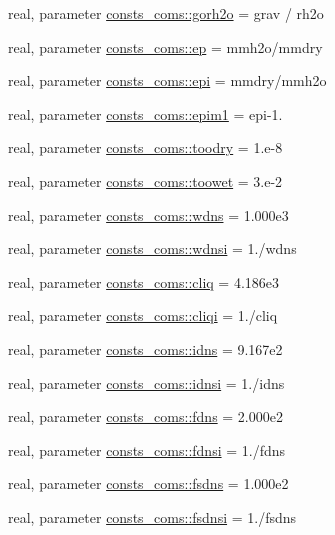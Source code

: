 \begin{DoxyCompactItemize}
real, parameter \hyperlink{namespaceconsts__coms_a0c33752e08988561908066daaa3574b9}{consts\+\_\+coms\+::gorh2o} = grav / rh2o
\item 
real, parameter \hyperlink{namespaceconsts__coms_a7c4e3129334941133aea2f4408d79a4c}{consts\+\_\+coms\+::ep} = mmh2o/mmdry
\item 
real, parameter \hyperlink{namespaceconsts__coms_a907f95778dc27a8537377dbefeb43c0b}{consts\+\_\+coms\+::epi} = mmdry/mmh2o
\item 
real, parameter \hyperlink{namespaceconsts__coms_a6f3042daf66dcb46bfb170331add64bb}{consts\+\_\+coms\+::epim1} = epi-\/1.
\item 
real, parameter \hyperlink{namespaceconsts__coms_a363a55ffb8996335aa3e826419496dd6}{consts\+\_\+coms\+::toodry} = 1.e-\/8
\item 
real, parameter \hyperlink{namespaceconsts__coms_a2f92e5b6f096a28a59849a98a0cb18bf}{consts\+\_\+coms\+::toowet} = 3.e-\/2
\item 
real, parameter \hyperlink{namespaceconsts__coms_a831ac48090426d5432c26edb7cbac367}{consts\+\_\+coms\+::wdns} = 1.\+000e3
\item 
real, parameter \hyperlink{namespaceconsts__coms_a78d4f96ff3c5c11fd36ccb8ccc403232}{consts\+\_\+coms\+::wdnsi} = 1./wdns
\item 
real, parameter \hyperlink{namespaceconsts__coms_a13d31490311637a98d90c0582964525a}{consts\+\_\+coms\+::cliq} = 4.\+186e3
\item 
real, parameter \hyperlink{namespaceconsts__coms_aef968d7aee293bda6bc13f116d5b0de3}{consts\+\_\+coms\+::cliqi} = 1./cliq
\item 
real, parameter \hyperlink{namespaceconsts__coms_aa7a06b5486b2b3e17aeb2bb7b0318e11}{consts\+\_\+coms\+::idns} = 9.\+167e2
\item 
real, parameter \hyperlink{namespaceconsts__coms_a361a469660d9429305a43049e625c83a}{consts\+\_\+coms\+::idnsi} = 1./idns
\item 
real, parameter \hyperlink{namespaceconsts__coms_a410d70e87edda0633a3eae3390fb500e}{consts\+\_\+coms\+::fdns} = 2.\+000e2
\item 
real, parameter \hyperlink{namespaceconsts__coms_ae51d569a4dc215678ec17d04f52645b4}{consts\+\_\+coms\+::fdnsi} = 1./fdns
\item 
real, parameter \hyperlink{namespaceconsts__coms_a2fcb787deb1df9a72dae0339dd8143a5}{consts\+\_\+coms\+::fsdns} = 1.\+000e2
\item 
real, parameter \hyperlink{namespaceconsts__coms_a75c6813a29c7acfe89551da232b96078}{consts\+\_\+coms\+::fsdnsi} = 1./fsdns

\end{DoxyCompactItemize}
